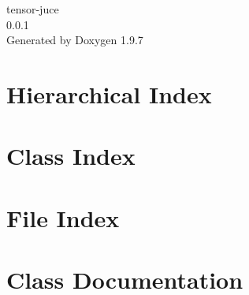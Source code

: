 \documentclass[twoside]{book}
\newcommand{\+}{\discretionary{\mbox{\scriptsize$\hookleftarrow$}}{}{}}
\newcommand{\clearemptydoublepage}{%
    \newpage{\pagestyle{empty}\cleardoublepage}%
  }
\begin{document}
  \raggedbottom
    \hypersetup{pageanchor=false,
                bookmarksnumbered=true,
                pdfencoding=unicode
               }
  \begin{titlepage}
  \vspace*{7cm}
  \begin{center}%
  {\Large tensor-\/juce}\\
  [1ex]\large 0.\+0.\+1 \\
  \vspace*{1cm}
  {\large Generated by Doxygen 1.9.7}\\
  \end{center}
  \end{titlepage}
  \clearemptydoublepage
  \tableofcontents
  \clearemptydoublepage
  \hypersetup{pageanchor=true}
\chapter{Hierarchical Index}

\chapter{Class Index}

\chapter{File Index}

\chapter{Class Documentation}








































\end{document}
